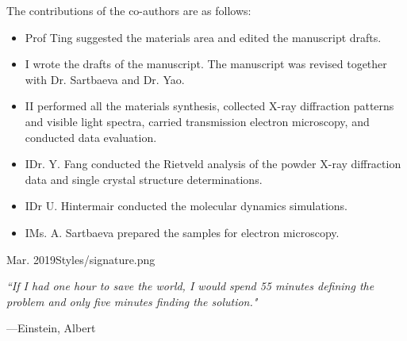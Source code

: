\documentclass[12pt,a4paper]{Thesis} %
\begin{document}
{	The contributions of the co-authors are as follows:
	\begin{itemize}[topsep=1pt,itemsep=1pt,partopsep=1pt, parsep=1pt]
		\item Prof Ting suggested the materials area and edited the manuscript drafts.
		\item I wrote the drafts of the manuscript.  The manuscript was revised together with Dr. Sartbaeva and Dr. Yao.
		\item II performed all the materials synthesis, collected X-ray diffraction patterns and visible light spectra, carried transmission electron microscopy, and conducted data evaluation.
		\item IDr. Y. Fang conducted the Rietveld analysis of the powder X-ray diffraction data and single crystal structure determinations.
		\item IDr U. Hintermair conducted the molecular dynamics simulations.
		\item IMs. A. Sartbaeva prepared the samples for electron microscopy.
	\end{itemize}
}{Mar. 2019}{Styles/signature.png}





\pagestyle{empty} %
\emph{``If I had one hour to save the world, I would spend 55 minutes defining the problem and only five minutes finding the solution."}

\begin{flushright}
---Einstein, Albert
\end{flushright}
\null\vfill %
\end{document}
